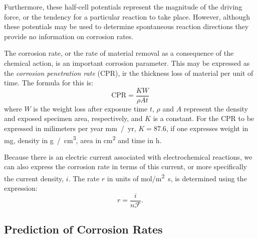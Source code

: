Furthermore, these half-cell potentials represent the magnitude of the driving force, or the tendency for a particular reaction to take place. However, although these potentials may be used to determine spontaneous reaction directions they provide no information on corrosion rates.

The corrosion rate, or the rate of material removal as a consequence of the chemical action, is an important corrosion parameter. This may be expressed as the \textit{corrosion penetration rate} (CPR), ir the thickness loss of material per unit of time. The formula for this is:
\[ 
\mathrm{CPR} = \frac{KW}{\rho A t}
\]
where $W$ is the weight loss after exposure time $t$, $\rho$ and $A$ represent the density and exposed specimen area, respectively, and $K$ is a constant. For the CPR to be expressed in milimeters per year \unit{mm / yr}, $K = \num{87,6}$, if one expresses weight in \unit{mg}, density in \unit{g / cm^3}, area in \unit{cm^2} and time in \unit{h}.

Because there is an electric current associated with electrochemical reactions, we can also express the corrosion rate in terms of this current, or more specifically the current density, $i$. The rate $r$ in units of \unit{mol/\m^2.\s}, is determined using the expression:
\[ 
r = \frac{i}{n \mathcal{F}}
.\]

\subsection{Prediction of Corrosion Rates}

